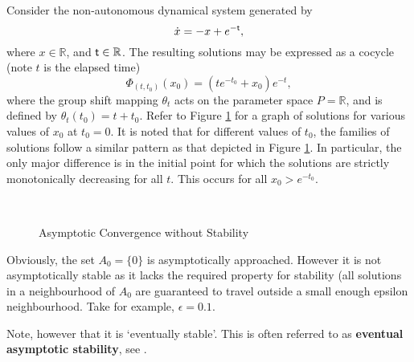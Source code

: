 \begin{eg}
Consider the non-autonomous dynamical system generated by
\begin{equation}\label{asseg1eq}
 \dot{x} = -x + e^{- \mathsf{\mathsf{t}}},
\end{equation}
where $x \in \mathbb{R}$, and $ \mathsf{\mathsf{t}} \in \mathbb{R}$. The resulting solutions
may be expressed as a cocycle (note $t$ is the elapsed time)
\[ \Phi_{(t,t_0)}(x_0) = (t e^{-t_0} + x_0) e^{-t}, \]
where the group shift mapping $\theta_t$ acts on the parameter space $P =
\mathbb{R}$, and is defined by $\theta_t (t_0) = t +t_0$. Refer to Figure
\ref{asseg1} for a graph of solutions for various values of $x_0$ at $t_0 =
0$. It is noted that for different values of $t_0$, the families of
solutions follow a similar pattern as that depicted in Figure \ref{asseg1}.
In particular, the only major difference is in the initial point for which the
solutions are strictly monotonically decreasing for all $t$. This occurs
for all $x_0 > e^{-t_0}$.

\begin{figure}[htb]
\begin{center}
\leavevmode
\hbox{
\epsfxsize=8.5cm
  }%
\protect\caption{Asymptotic Convergence without Stability}
      \protect\label{asseg1}
\end{center}
\end{figure}

Obviously, the set $A_0 = \{0\}$ is asymptotically approached.
However it is not asymptotically stable as it lacks the required
property for stability (all solutions in a neighbourhood of $A_0$
are guaranteed to travel outside a small enough epsilon
neighbourhood. Take for example, $\epsilon = 0.1$.

Note, however that it is `eventually stable'. This is often referred to as {\bf
eventual asymptotic stability}, see \cite{RoHaLa77,Yo66}.
\end{eg}

